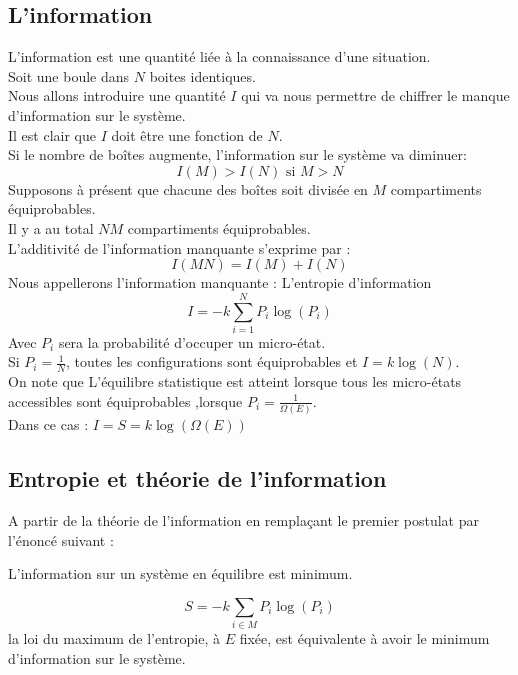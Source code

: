 \documentclass[12pt,oneside]{book}
\begin{document}
\subsection{L'information}
L'information est une quantité liée à la connaissance d'une situation.\\
Soit une boule dans $N$ boites identiques.\\
Nous allons introduire une quantité $I$ qui va nous permettre de chiffrer le manque d'information sur le système.\\
Il est clair que $I$ doit être une fonction de $N$.\\
Si le nombre de boîtes augmente, l'information sur le système va diminuer:
\[ I(M) > I(N) \text{ si } M > N \]
Supposons à présent que chacune des boîtes soit divisée en $M$ compartiments équiprobables.\\
Il y a au total $NM$ compartiments équiprobables.\\
L'additivité de l'information manquante s'exprime par :
\[ I(MN) = I(M) + I(N) \]
Nous appellerons l'information manquante : L'entropie d'information
\[ I = -k\sum_{i=1}^N P_i\log(P_i) \]
Avec $P_i$ sera la probabilité d'occuper un micro-état.\\
Si $P_i = \frac{1}{N}$, toutes les configurations sont équiprobables et $I = k\log(N)$.\\
On note que L'équilibre statistique est atteint lorsque tous les micro-états accessibles sont équiprobables ,lorsque $P_i = \frac{1}{\Omega(E)}$.\\
Dans ce cas : $I = S = k\log(\Omega(E))$
\subsection{Entropie et théorie de l'information}
A partir de la théorie de l'information en remplaçant le premier postulat par l'énoncé suivant :
\begin{center}
	L'information sur un système en équilibre est minimum.
\end{center}
\[ S = -k\sum_{i\in M} P_i\log(P_i) \]
la loi du maximum de l'entropie, à $E$ fixée, est équivalente à avoir le minimum d'information sur le système.
\end{document}

